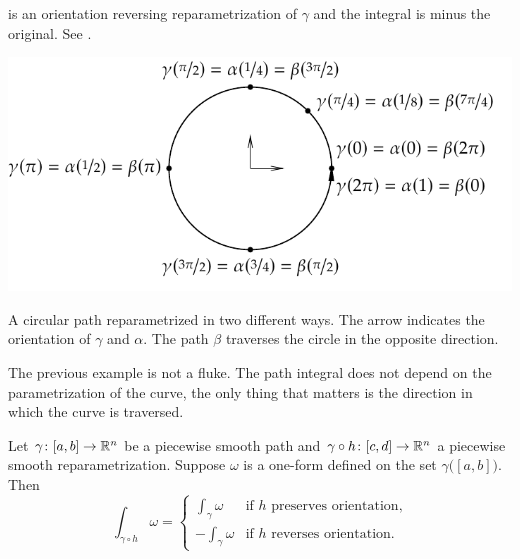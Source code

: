 \begin{example}
is an orientation reversing reparametrization of $\gamma$ and the integral is
minus the original.  See .
\begin{myfigureht}
\includegraphics{figures/circlepathrepar}
\caption{A circular path reparametrized in two different ways. The arrow
indicates the orientation of $\gamma$ and $\alpha$. The path $\beta$ traverses
the circle in the
opposite direction.\label{fig:circlepathrepar}}
\end{myfigureht}
\end{example}

The previous example is not a fluke.
The path integral does not depend on the parametrization of
the curve, the only thing that matters is the direction in which the curve
is traversed.

\begin{prop} \label{mv:prop:pathintrepararam}
Let $\gamma \colon [a,b] \to {\mathbb{R}}^n$ be a piecewise smooth path and
$\gamma \circ h \colon [c,d] \to {\mathbb{R}}^n$ a piecewise smooth reparametrization.
Suppose $\omega$ is a one-form defined on the set $\gamma\bigl([a,b]\bigr)$.  Then
\begin{equation*}
\int_{\gamma \circ h} \omega =
\begin{cases}
\int_{\gamma} \omega  & \text{if } h \text{ preserves orientation,}\\
-\int_{\gamma} \omega & \text{if } h \text{ reverses orientation.}
\end{cases}
\end{equation*}
\end{prop}

